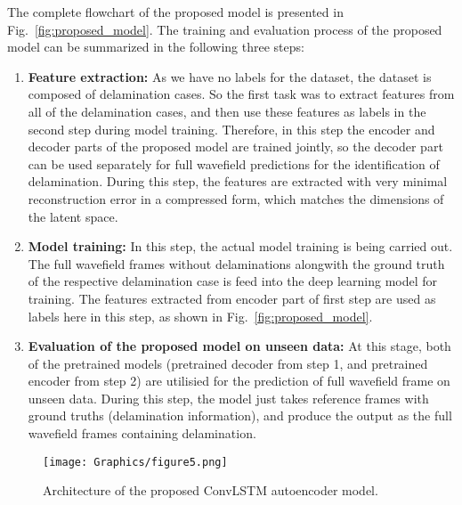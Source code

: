 The complete flowchart of the proposed model is presented in 
Fig.~\ref{fig:proposed_model}. 
The training and evaluation process of the proposed model can be summarized in 
the following three steps:  
\begin{enumerate}
	\item{\textbf{Feature extraction:} As we have no labels for the dataset, 
		the dataset is composed of delamination cases. 
		So the first task was to extract features from all of the delamination 
		cases, and then use these features as labels in the second step during 
		model training.
		Therefore, in this step the encoder and decoder parts of the proposed 
		model are trained jointly, so the decoder part can be used separately 
		for full wavefield predictions for the identification of delamination.
		During this step, the features are extracted with very minimal 
		reconstruction error in a compressed form, which matches the dimensions 
		of the latent space.}
	\item{\textbf{Model training:} In this step, the actual model training is 
		being carried out. 
		The full wavefield frames without delaminations alongwith the ground 
		truth 
		of the respective delamination case is feed into the deep learning 
		model 
		for training. 
		The features extracted from encoder part of first step are used as 
		labels 
		here in this step, as shown in Fig.~\ref{fig:proposed_model}}.
	\item{\textbf{Evaluation of the proposed model on unseen data:} At this 
		stage, both of the pretrained models (pretrained decoder from step 1, 
		and pretrained encoder from step 2) are utilisied for the prediction of 
		full wavefield frame on unseen data.
		During this step, the model just takes reference frames with ground 
		truths (delamination information), and produce the output as the full 
		wavefield frames containing delamination.}
\end{enumerate}

\begin{figure} [h!]
	\begin{center}
		\texttt{[image: Graphics/figure5.png]}
	\end{center}
	\caption{Architecture of the proposed ConvLSTM autoencoder model.} 
	\label{fig:convlstm}
\end{figure}

